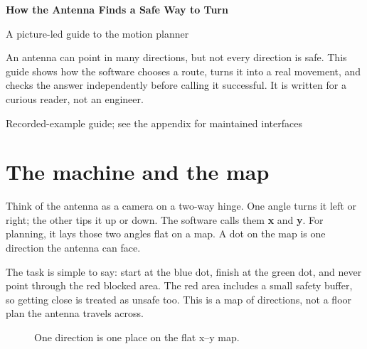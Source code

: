 \documentclass[10pt,letterpaper]{article}
\newcommand{\key}[1]{\textbf{#1}}
\begin{document}
\begin{titlepage}
\centering
\vspace*{1.1in}
{\Huge\bfseries How the Antenna Finds a Safe Way to Turn\par}
\vspace{.35in}
{\Large A picture-led guide to the motion planner\par}
\vfill
\begin{minipage}{.82\textwidth}
\large
An antenna can point in many directions, but not every direction is safe.
This guide shows how the software chooses a route, turns it into a real
movement, and checks the answer independently before calling it successful.
It is written for a curious reader, not an engineer.
\end{minipage}
\vfill
\large Recorded-example guide; see the appendix for maintained interfaces
\end{titlepage}
\tableofcontents
\clearpage

\section{The machine and the map}

Think of the antenna as a camera on a two-way hinge. One angle turns it left or
right; the other tips it up or down. The software calls them \key{x} and
\key{y}. For planning, it lays those two angles flat on a map. A dot on
the map is one direction the antenna can face.

The task is simple to say: start at the blue dot, finish at the green dot, and
never point through the red blocked area. The red area includes a small safety
buffer, so getting close is treated as unsafe too. This is a map of directions,
not a floor plan the antenna travels across.

\begin{figure}[ht]
\centering
{}
\caption{One direction is one place on the flat x--y map.}
\label{fig:map}
\end{figure}
\end{document}

